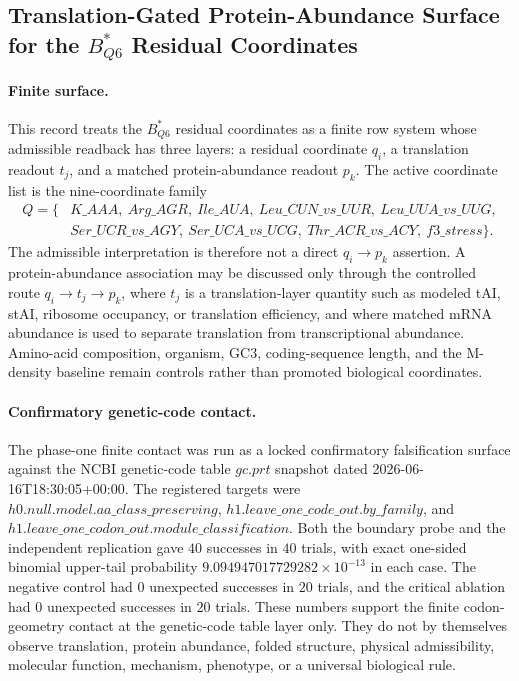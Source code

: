 \subsection{Translation-Gated Protein-Abundance Surface for the $B^*_{Q6}$ Residual Coordinates}
\label{sec:bioreality-q6-translation-gated-protein-abundance}

\paragraph{Finite surface.}
This record treats the $B^*_{Q6}$ residual coordinates as a finite row system whose admissible readback has three layers: a residual coordinate $q_i$, a translation readout $t_j$, and a matched protein-abundance readout $p_k$. The active coordinate list is the nine-coordinate family
$$
\begin{aligned}
Q=\{&K\_AAA,\ Arg\_AGR,\ Ile\_AUA,\ Leu\_CUN\_vs\_UUR,\ Leu\_UUA\_vs\_UUG,\\
&Ser\_UCR\_vs\_AGY,\ Ser\_UCA\_vs\_UCG,\ Thr\_ACR\_vs\_ACY,\ f3\_stress\}.
\end{aligned}
$$
The admissible interpretation is therefore not a direct $q_i\to p_k$ assertion. A protein-abundance association may be discussed only through the controlled route $q_i\to t_j\to p_k$, where $t_j$ is a translation-layer quantity such as modeled tAI, stAI, ribosome occupancy, or translation efficiency, and where matched mRNA abundance is used to separate translation from transcriptional abundance. Amino-acid composition, organism, GC3, coding-sequence length, and the M-density baseline remain controls rather than promoted biological coordinates.

\paragraph{Confirmatory genetic-code contact.}
The phase-one finite contact was run as a locked confirmatory falsification surface against the NCBI genetic-code table $gc.prt$ snapshot dated 2026-06-16T18:30:05+00:00. The registered targets were $h0.null.model.aa\_class\_preserving$, $h1.leave\_one\_code\_out.by\_family$, and $h1.leave\_one\_codon\_out.module\_classification$. Both the boundary probe and the independent replication gave $40$ successes in $40$ trials, with exact one-sided binomial upper-tail probability $9.094947017729282\times 10^{-13}$ in each case. The negative control had $0$ unexpected successes in $20$ trials, and the critical ablation had $0$ unexpected successes in $20$ trials. These numbers support the finite codon-geometry contact at the genetic-code table layer only. They do not by themselves observe translation, protein abundance, folded structure, physical admissibility, molecular function, mechanism, phenotype, or a universal biological rule.

